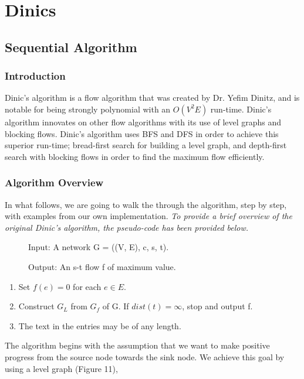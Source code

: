 \section{Dinics}

\subsection{Sequential Algorithm}
    \subsubsection{Introduction}
    Dinic's algorithm is a flow algorithm that was created by Dr. Yefim Dinitz, and is notable for being strongly polynomial with an $O(V^2E)$ run-time. Dinic's algorithm innovates on other flow algorithms with its use of level graphs and blocking flows. Dinic's algorithm uses BFS and DFS in order to achieve this superior run-time; bread-first search for building a level graph, and depth-first search with blocking flows in order to find the maximum flow efficiently.
    
    \subsubsection{Algorithm Overview}
       In what follows, we are going to walk the through the algorithm, step by step, with examples from our own implementation. \emph{To provide a brief overview of the original Dinic's algorithm, the pseudo-code has been provided below.} \\
       
    \begin{description}
        \item[] Input: A network G = ((V, E), c, s, t).
        \item[] Output: An s-t flow f of maximum value.  
    \end{description}    
    \begin{enumerate}
        \item Set $f(e) = 0$ for each $e \in E.$
        \item Construct $G_L$ from $G_f$ of G. If $dist(t)=\infty$, stop and output f.
        \item The text in the entries may be of any length.\\
    \end{enumerate}
    
    The algorithm begins with the assumption that we want to make positive progress from the source node towards the sink node. We achieve this goal by using a level graph (Figure 11),
    
